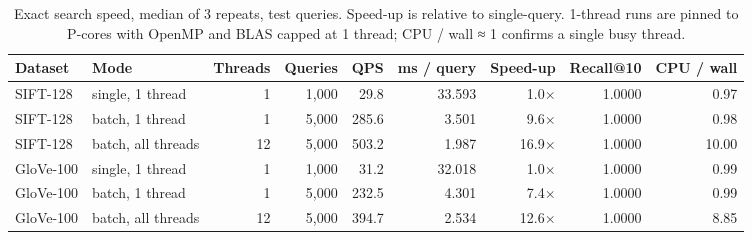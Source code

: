 \begin{table}[t]
\centering
\small
\caption{Exact search speed, median of 3 repeats, test queries. Speed-up is relative to single-query. 1-thread runs are pinned to P-cores with OpenMP and BLAS capped at 1 thread; CPU / wall ≈ 1 confirms a single busy thread.}
\label{tab:t1b_exact_timing}
\begin{tabular}{llrrrrrrr}
\toprule
Dataset & Mode & Threads & Queries & QPS & ms / query & Speed-up & Recall@10 & CPU / wall \\
\midrule
SIFT-128 & single, 1 thread & 1 & 1,000 & 29.8 & 33.593 & 1.0$\times$ & 1.0000 & 0.97 \\
SIFT-128 & batch, 1 thread & 1 & 5,000 & 285.6 & 3.501 & 9.6$\times$ & 1.0000 & 0.98 \\
SIFT-128 & batch, all threads & 12 & 5,000 & 503.2 & 1.987 & 16.9$\times$ & 1.0000 & 10.00 \\
GloVe-100 & single, 1 thread & 1 & 1,000 & 31.2 & 32.018 & 1.0$\times$ & 1.0000 & 0.99 \\
GloVe-100 & batch, 1 thread & 1 & 5,000 & 232.5 & 4.301 & 7.4$\times$ & 1.0000 & 0.99 \\
GloVe-100 & batch, all threads & 12 & 5,000 & 394.7 & 2.534 & 12.6$\times$ & 1.0000 & 8.85 \\
\bottomrule
\end{tabular}
\end{table}
